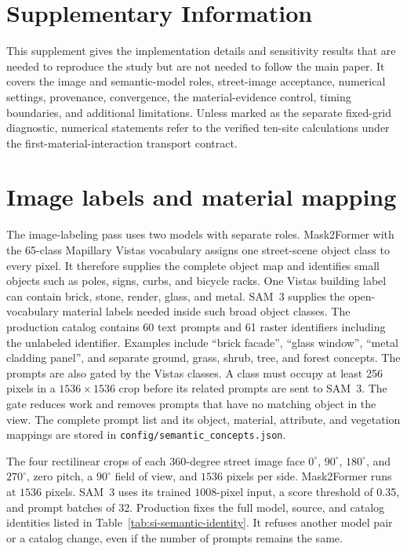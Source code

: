 \section*{Supplementary Information}
\label{sec:si}

This supplement gives the implementation details and sensitivity results that
are needed to reproduce the study but are not needed to follow the main paper.
It covers the image and semantic-model roles, street-image acceptance, numerical settings,
provenance, convergence, the material-evidence control, timing boundaries, and
additional limitations. Unless marked as the separate fixed-grid diagnostic,
numerical statements refer to the verified ten-site calculations under the
first-material-interaction transport contract.

\section{Image labels and material mapping}
\label{sec:si-semantics}

The image-labeling pass uses two models with separate roles. Mask2Former with the
65-class Mapillary Vistas vocabulary assigns one street-scene object class to every pixel. It
therefore supplies the complete object map and identifies small objects such
as poles, signs, curbs, and bicycle racks. One Vistas building label can contain
brick, stone, render, glass, and metal. SAM~3 supplies the open-vocabulary
material labels needed inside such broad object classes. The production
catalog contains 60 text prompts and 61 raster identifiers including the
unlabeled identifier. Examples include ``brick facade'', ``glass window'',
``metal cladding panel'', and separate ground, grass, shrub,
tree, and forest concepts. The prompts are also gated by the Vistas classes. A class
must occupy at least 256 pixels in a $1536\times1536$ crop before its related
prompts are sent to SAM~3. The gate reduces work and removes prompts that have no
matching object in the view. The complete prompt list and its object, material,
attribute, and vegetation mappings are stored in
\texttt{config/semantic\_concepts.json}.

The four rectilinear crops of each 360-degree street image face $0^\circ$,
$90^\circ$, $180^\circ$, and $270^\circ$, zero pitch, a $90^\circ$ field of
view, and $1536$ pixels per side. Mask2Former runs at $1536$ pixels. SAM~3 uses
its trained $1008$-pixel input, a score threshold of 0.35, and prompt batches of
32. Production fixes the full model, source, and catalog identities listed in
Table~\ref{tab:si-semantic-identity}. It refuses another model pair or a catalog
change, even if the number of prompts remains the same.


